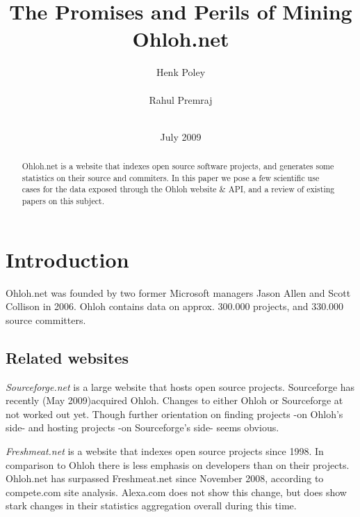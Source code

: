 \documentclass{sig-alternate}
\begin{document}
\toappear{} %

\title{The Promises and Perils of Mining Ohloh.net}

\author{
\alignauthor Henk Poley\\
  \\
\alignauthor Rahul Premraj\\
  \\
}

\date{July 2009}


\maketitle

\begin{abstract}
Ohloh.net is a website that indexes open source software projects, and generates some statistics on their source and commiters. In this paper we pose a few scientific use cases for the data exposed through the Ohloh website \& API, and a review of existing papers on this subject.
\end{abstract}


\section{Introduction}
Ohloh.net was founded by two former Microsoft managers Jason Allen and Scott Collison in 2006. Ohloh contains data on approx. 300.000 projects, and 330.000 source committers.


\subsection{Related websites}
\emph{Sourceforge.net} is a large website that hosts open source projects. Sourceforge has recently (May 2009)acquired Oh\-loh. Changes to either Ohloh or Sourceforge at not worked out yet. Though further orientation on finding projects -on Ohloh's side- and hosting projects -on Sourceforge's side- seems obvious.

\emph{Freshmeat.net} is a website that indexes open source pro\-jects since 1998. In comparison to Ohloh there is less emphasis on developers than on their projects. Ohloh.net has surpassed Freshmeat.net since November 2008, according to compete.com site analysis. Alexa.com does not show this change, but does show stark changes in their statistics aggregation overall during this time.
\end{document}
